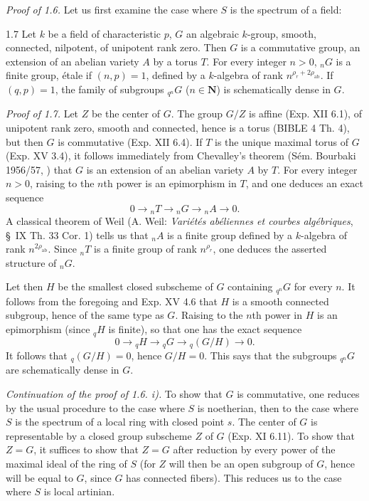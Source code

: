 \par\noindent\emph{Proof of 1.6.}
Let us first examine the case where $S$ is the spectrum of a field:
\begin{lemma}{1.7}\label{XVI.1.7}
Let $k$ be a field of characteristic $p$, $G$ an algebraic $k$-group, smooth, connected, nilpotent, of unipotent rank zero. Then $G$ is a commutative group, an extension of an abelian variety $A$ by a torus $T$. For every integer $n>0$, ${}_nG$ is a finite group, étale if $(n,p)=1$, defined by a $k$-algebra of rank $n^{\rho_r+2\rho_{\mathrm{ab}}}$. If $(q,p)=1$, the family of subgroups ${}_{q^n}G$ ($n\in\mathbf N$) is schematically dense in $G$.
\end{lemma}
\par\noindent\emph{Proof of 1.7.}
Let $Z$ be the center of $G$. The group $G/Z$ is affine (Exp. XII 6.1), of unipotent rank zero, smooth and connected, hence is a torus (BIBLE 4 Th. 4), but then $G$ is commutative (Exp. XII 6.4). If $T$ is the unique maximal torus of $G$ (Exp. XV 3.4), it follows immediately from Chevalley's theorem (Sém. Bourbaki 1956/57, ) that $G$ is an extension of an abelian variety $A$ by $T$. For every integer $n>0$, raising to the $n$th power is an epimorphism in $T$, and one deduces an exact sequence
\[
0\longrightarrow{}_nT\longrightarrow{}_nG\longrightarrow{}_nA\longrightarrow0.
\]
A classical theorem of Weil (A. Weil: \emph{Variétés abéliennes et courbes algébriques}, \S\ IX Th. 33 Cor. 1) tells us that ${}_nA$ is a finite group defined by a $k$-algebra of rank $n^{2\rho_{\mathrm{ab}}}$. Since ${}_nT$ is a finite group of rank $n^{\rho_r}$, one deduces the asserted structure of ${}_nG$.

Let then $H$ be the smallest closed subscheme of $G$ containing ${}_{q^n}G$ for every $n$. It follows from the foregoing and Exp. XV 4.6 that $H$ is a smooth connected subgroup, hence of the same type as $G$. Raising to the $n$th power in $H$ is an epimorphism (since ${}_qH$ is finite), so that one has the exact sequence
\[
0\longrightarrow{}_qH\longrightarrow{}_qG\longrightarrow{}_q(G/H)\longrightarrow0.
\]
It follows that ${}_q(G/H)=0$, hence $G/H=0$. This says that the subgroups ${}_{q^n}G$ are schematically dense in $G$.

\par\noindent\emph{Continuation of the proof of 1.6. i).}
To show that $G$ is commutative, one reduces by the usual procedure to the case where $S$ is noetherian, then to the case where $S$ is the spectrum of a local ring with closed point $s$. The center of $G$ is representable by a closed group subscheme $Z$ of $G$ (Exp. XI 6.11). To show that $Z=G$, it suffices to show that $Z=G$ after reduction by every power of the maximal ideal of the ring of $S$ (for $Z$ will then be an open subgroup of $G$, hence will be equal to $G$, since $G$ has connected fibers). This reduces us to the case where $S$ is local artinian.


